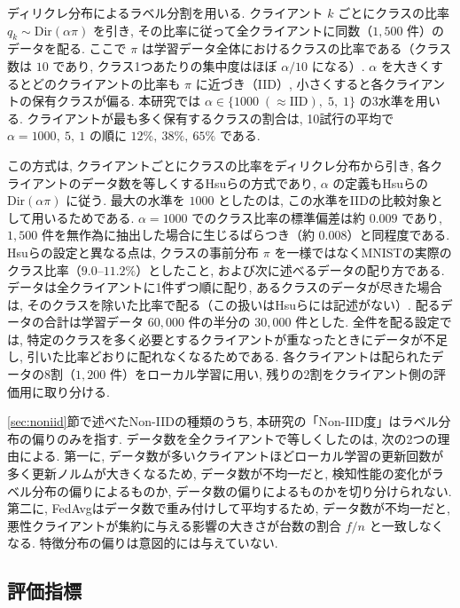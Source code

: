 \documentclass[a4j, twocolumn, dvipdfmx]{jsarticle}
\begin{document}
ディリクレ分布によるラベル分割を用いる. クライアント $k$ ごとにクラスの比率 $q_k \sim \mathrm{Dir}(\alpha \pi)$ を引き, その比率に従って全クライアントに同数（$1{,}500$ 件）のデータを配る. ここで $\pi$ は学習データ全体におけるクラスの比率である（クラス数は $10$ であり, クラス1つあたりの集中度はほぼ $\alpha/10$ になる）. $\alpha$ を大きくするとどのクライアントの比率も $\pi$ に近づき（IID）, 小さくすると各クライアントの保有クラスが偏る. 本研究では $\alpha \in \{1000\;(\approx\text{IID}),\; 5,\; 1\}$ の3水準を用いる. クライアントが最も多く保有するクラスの割合は, 10試行の平均で $\alpha=1000,\ 5,\ 1$ の順に $12\%,\ 38\%,\ 65\%$ である.

この方式は, クライアントごとにクラスの比率をディリクレ分布から引き, 各クライアントのデータ数を等しくするHsuら\cite{hsu2019measuring}の方式であり, $\alpha$ の定義もHsuらの $\mathrm{Dir}(\alpha\pi)$ に従う. 最大の水準を $1000$ としたのは, この水準をIIDの比較対象として用いるためである. $\alpha=1000$ でのクラス比率の標準偏差は約 $0.009$ であり, $1{,}500$ 件を無作為に抽出した場合に生じるばらつき（約 $0.008$）と同程度である. Hsuらの設定と異なる点は, クラスの事前分布 $\pi$ を一様ではなくMNISTの実際のクラス比率（$9.0$--$11.2\%$）としたこと, および次に述べるデータの配り方である. データは全クライアントに1件ずつ順に配り, あるクラスのデータが尽きた場合は, そのクラスを除いた比率で配る（この扱いはHsuらには記述がない）. 配るデータの合計は学習データ $60{,}000$ 件の半分の $30{,}000$ 件とした. 全件を配る設定では, 特定のクラスを多く必要とするクライアントが重なったときにデータが不足し, 引いた比率どおりに配れなくなるためである. 各クライアントは配られたデータの8割（$1{,}200$ 件）をローカル学習に用い, 残りの2割をクライアント側の評価用に取り分ける.

\ref{sec:noniid}節で述べたNon-IIDの種類のうち, 本研究の「Non-IID度」はラベル分布の偏りのみを指す. データ数を全クライアントで等しくしたのは, 次の2つの理由による. 第一に, データ数が多いクライアントほどローカル学習の更新回数が多く更新ノルムが大きくなるため, データ数が不均一だと, 検知性能の変化がラベル分布の偏りによるものか, データ数の偏りによるものかを切り分けられない. 第二に, FedAvgはデータ数で重み付けして平均するため, データ数が不均一だと, 悪性クライアントが集約に与える影響の大きさが台数の割合 $f/n$ と一致しなくなる. 特徴分布の偏りは意図的には与えていない.

\subsection{評価指標}
\label{sec:metrics}
\end{document}
